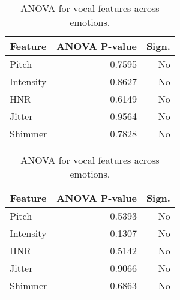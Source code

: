 \begin{table}[H]
    \centering 
    \begin{subtable}[b]{0.48\textwidth}
        \centering
        \caption*{\textbf{Positive recordings}}
        \begin{tabular}{lrr}
        \toprule
        \multicolumn{1}{c}{\textbf{Feature}} & \textbf{ANOVA P-value} & \textbf{Sign.} \\
        \midrule
        Pitch      & 0.7595    & No          \\
        Intensity  & 0.8627    & No          \\
        HNR        & 0.6149    & No          \\
        Jitter     & 0.9564    & No          \\
        Shimmer    & 0.7828    & No          \\
        \bottomrule
        \end{tabular}
        \caption{ANOVA: Positive recordings.}
        \label{tab:rq1_anova_pos}
    \end{subtable}
    \hfill
    \begin{subtable}[b]{0.48\textwidth}
        \centering
        \caption*{\textbf{Negative recordings}}
        \begin{tabular}{lrr}
        \toprule
        \multicolumn{1}{c}{\textbf{Feature}} & \textbf{ANOVA P-value} & \textbf{Sign.} \\
        \midrule
        Pitch      & 0.5393    & No          \\
        Intensity  & 0.1307    & No          \\
        HNR        & 0.5142    & No          \\
        Jitter     & 0.9066    & No          \\
        Shimmer    & 0.6863    & No          \\
        \bottomrule
        \end{tabular}
        \caption{ANOVA: Negative recordings.}
        \label{tab:rq1_anova_neg}
    \end{subtable}
    \caption{ANOVA for vocal features across emotions.}
    \label{tab:rq1_anova_all}
\end{table}  


